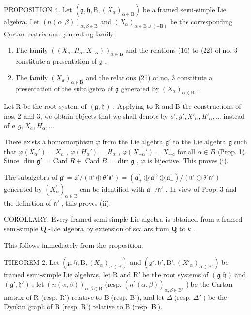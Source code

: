 PROPOSITION 4. Let \((\mathfrak{g},\mathfrak{h},\mathrm{B},(X_{\alpha})_{\alpha\in\mathrm{B}})\) be a framed semi-simple Lie algebra. Let \((n(\alpha,\beta))_{\alpha,\beta\in\mathrm{B}}\) and \((X_{\alpha})_{\alpha\in\mathrm{B}\cup(-\mathrm{B})}\) be the corresponding Cartan matrix and generating family.

\begin{enumerate}
\def\labelenumi{(\roman{enumi})}
\item
  The family \(((X_{\alpha}, H_{\alpha}, X_{-\alpha}))_{\alpha \in \mathrm{B}}\) and the relations (16) to (22) of no. 3 constitute a presentation of \(\mathfrak{g}\) .
\item
  The family \((X_{\alpha})_{\alpha \in \mathrm{B}}\) and the relations (21) of no. 3 constitute a presentation of the subalgebra of \(\mathfrak{g}\) generated by \((X_{\alpha})_{\alpha \in \mathrm{B}}\) .
\end{enumerate}

Let R be the root system of \((\mathfrak{g},\mathfrak{h})\) . Applying to R and B the constructions of nos. 2 and 3, we obtain objects that we shall denote by \(a', g', X'_{\alpha}, H'_{\alpha}, \ldots\) instead of \(a, g, X_{\alpha}, H_{\alpha}, \ldots\)

There exists a homomorphism \(\varphi\) from the Lie algebra \(\mathfrak{g}'\) to the Lie algebra \(\mathfrak{g}\) such that \(\varphi(X_{\alpha}') = X_{\alpha}\) , \(\varphi(H_{\alpha}') = H_{\alpha}\) , \(\varphi(X_{-\alpha}') = X_{-\alpha}\) for all \(\alpha \in B\) (Prop. 1). Since \(\dim \mathfrak{g}' = \operatorname{Card} R + \operatorname{Card} B = \dim \mathfrak{g}\) , \(\varphi\) is bijective. This proves (i).

The subalgebra of \(\mathfrak{g}' = \mathfrak{a}' / (\mathfrak{n}'\oplus \theta'\mathfrak{n}') = (\mathfrak{a}_+^\prime \oplus \mathfrak{a}^{\prime 0}\oplus \mathfrak{a}_-^\prime) / (\mathfrak{n}'\oplus \theta'\mathfrak{n}')\) generated by \((X_{\alpha}^{\prime})_{\alpha \in \mathrm{B}}\) can be identified with \(\mathfrak{a}_+^\prime /\mathfrak{n}'\) . In view of Prop. 3 and the definition of \(\mathfrak{n}'\) , this proves (ii).

COROLLARY. Every framed semi-simple Lie algebra is obtained from a framed semi-simple \(\mathbf{Q}\) -Lie algebra by extension of scalars from \(\mathbf{Q}\) to \(k\) .

This follows immediately from the proposition.

THEOREM 2. Let \((\mathfrak{g},\mathfrak{h},\mathrm{B},(X_{\alpha})_{\alpha \in \mathrm{B}})\) and \((\mathfrak{g}',\mathfrak{h}',\mathrm{B}',(X'_{\alpha})_{\alpha \in \mathrm{B}'})\) be framed semi-simple Lie algebras, let R and R' be the root systems of \((\mathfrak{g},\mathfrak{h})\) and \((\mathfrak{g}',\mathfrak{h}')\) , let \((n(\alpha ,\beta))_{\alpha ,\beta \in \mathrm{B}}\) (resp. \((n^{\prime}(\alpha ,\beta))_{\alpha ,\beta \in \mathrm{B}'}\) ) be the Cartan matrix of R (resp. R') relative to B (resp. B'), and let \(\Delta\) (resp. \(\Delta'\) ) be the Dynkin graph of R (resp. R') relative to B (resp. B').

